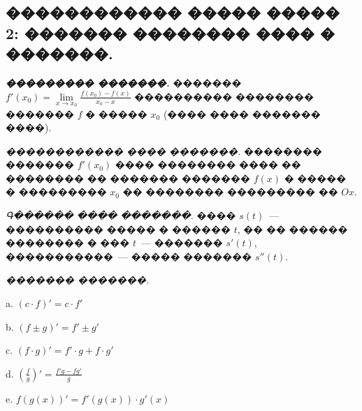 \documentclass[a4paper,12pt]{article}
\begin{document}
\newpage

\begin{center}
\section*{������������ ����� ����� 2: ������� �������� ���� � �������.}
\end{center}

\quad \textbf{\textit{��������� �������.}} ������� $f'(x_{0})=\lim\limits^{}_{x\rightarrow x_{0}}\frac{f(x_{0})-f(x)}{x_{0}-x}$ ���������� �������� ������� $f$ � ����� $x_{0}$ (���� ���� ������� ����).

\textit{������������ ���� �������.} �������� ������� $f'(x_{0})$ ���� �������� ���� �� �������� �� ������� ������� $f(x)$ � ����� � ��������� $x_{0}$ �� �������� ��������� �� $Ox$.

\textit{Գ������ ���� �������.} ���� $s(t)$~--- ���������� ����� � ������ $t$, �� �� ������ �������� � ��� $t$~--- ������� $s'(t)$, �����������~--- ����� ������� $s''(t)$.

\textit{������� �������.}

a. $(c\cdot f)' = c\cdot f'$

b. $(f\pm g)' = f'\pm g'$

c. $(f\cdot g)' = f'\cdot g + f\cdot g'$

d. $(\frac{f}{g})' = \frac{f'g-fg'}{g}$

e. $f(g(x))' = f'(g(x))\cdot g'(x)$

\medskip\medskip\medskip
\end{document}

